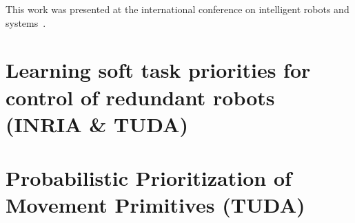 \documentclass[12pt,a4paper,twoside]{report}
\begin{document}
This work was presented at the international conference on intelligent robots and systems~\cite{lober_IROS2015}.

\chapter{Learning soft task priorities for control of redundant robots (INRIA \& TUDA)}\label{sec:Valerio}


\chapter{Probabilistic Prioritization of Movement Primitives (TUDA)}\label{sec:Alex}




\end{document}
